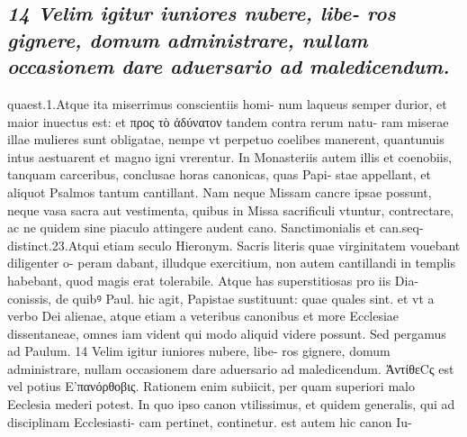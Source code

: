 \documentclass{article}
\begin{document}
\begin{pages}
\subsection*{\textit{14 Velim igitur iuniores nubere, libe- ros gignere, domum administrare, nullam occasionem dare aduersario ad maledicendum.}}quaest.1.Atque ita miserrimus conscientiis homi- num laqueus semper durior, et maior inuectus est: et προς τὸ ἀδύνατον tandem contra rerum natu- ram miserae illae mulieres sunt obligatae, nempe vt perpetuo coelibes manerent, quantunuis intus aestuarent et magno igni vrerentur. In Monasteriis autem illis et coenobiis, tanquam carceribus, conclusae horas canonicas, quas Papi- stae appellant, et aliquot Psalmos tantum cantillant. Nam neque Missam cancre ipsae possunt, neque vasa sacra aut vestimenta, quibus in Missa sacrificuli vtuntur, contrectare, ac ne quidem sine piaculo attingere audent cano. Sanctimonialis et can.seq- distinct.23.Atqui etiam seculo Hieronym. Sacris literis quae virginitatem vouebant diligenter o- peram dabant, illudque exercitium, non autem cantillandi in templis habebant, quod magis erat tolerabile. Atque has superstitiosas pro iis Dia- conissis, de quibꝰ Paul. hic agit, Papistae sustituunt: quae quales sint. et vt a verbo Dei alienae, atque etiam a veteribus canonibus et more Ecclesiae dissentaneae, omnes iam vident qui modo aliquid videre possunt. Sed pergamus ad Paulum. 14 Velim igitur iuniores nubere, libe- ros gignere, domum administrare, nullam occasionem dare aduersario ad maledicendum. ἈντίθεCς est vel potius Ε’πανόρθοβις. Rationem enim subiicit, per quam superiori malo Eeclesia mederi potest. In quo ipso canon vtilissimus, et quidem generalis, qui ad disciplinam Ecclesiasti- cam pertinet, continetur. est autem hic canon Iu-  \pend

\end{pages}
\end{document}

